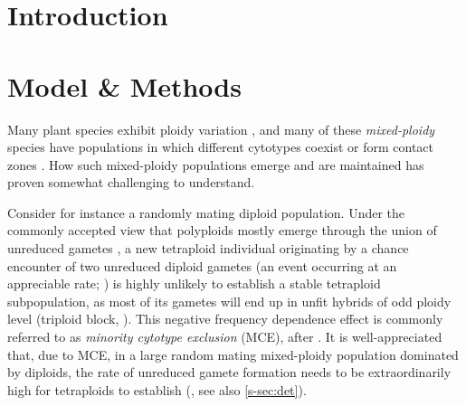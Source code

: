 \documentclass[unnumsec,webpdf,modern,large]{_oup-authoring-template}
\theoremstyle{thmstyleone}%
\theoremstyle{thmstyletwo}%
\theoremstyle{thmstylethree}%
\begin{document}
\section*{Introduction}

\section*{Model \& Methods}


Many plant species exhibit ploidy variation
\citep{levin2002,soltis2007,rice2015}, and many of these \textit{mixed-ploidy}
species have populations in which different cytotypes coexist or form contact
zones \citep{kolar2017}.
How such mixed-ploidy populations emerge and are maintained has proven somewhat
challenging to understand.

Consider for instance a randomly mating diploid population.
Under the commonly accepted view that polyploids mostly emerge through the
union of unreduced gametes \citep{bretagnolle1995,herben2016,kreiner2017b}, a
new tetraploid individual originating by a chance encounter of two unreduced
diploid gametes (an event occurring at an appreciable rate; \cite{kreiner2017})
is highly unlikely to establish a stable tetraploid subpopulation, as most of
its gametes will end up in unfit hybrids of odd ploidy level (triploid block,
\cite{ramsey1998,kohler2010,brown2024}).
This negative frequency dependence effect is commonly referred to as
\textit{minority cytotype exclusion} (MCE), after \cite{levin1975}.
It is well-appreciated that, due to MCE, in a large random mating mixed-ploidy
population dominated by diploids, the rate of unreduced gamete formation needs
to be extraordinarily high for tetraploids to establish (\cite{felber1997}, see
also \cref{s-sec:det}).
\end{document}
